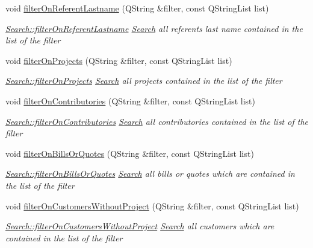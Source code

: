 \begin{DoxyCompactItemize}
void \hyperlink{classModels_1_1Search_a27536d8a999a32164e1ac90bf9d24906}{filter\-On\-Referent\-Lastname} (Q\-String \&filter, const Q\-String\-List list)
\begin{DoxyCompactList}\small\item\em \hyperlink{classModels_1_1Search_a27536d8a999a32164e1ac90bf9d24906}{Search\-::filter\-On\-Referent\-Lastname} \hyperlink{classModels_1_1Search}{Search} all referents last name contained in the {\itshape list} of the {\itshape filter} \end{DoxyCompactList}\item 
void \hyperlink{classModels_1_1Search_a4f5672fa4dc52e3ea7bda9b4c654147f}{filter\-On\-Projects} (Q\-String \&filter, const Q\-String\-List list)
\begin{DoxyCompactList}\small\item\em \hyperlink{classModels_1_1Search_a4f5672fa4dc52e3ea7bda9b4c654147f}{Search\-::filter\-On\-Projects} \hyperlink{classModels_1_1Search}{Search} all projects contained in the {\itshape list} of the {\itshape filter} \end{DoxyCompactList}\item 
void \hyperlink{classModels_1_1Search_acb948c15a52305c29cf4c5b9489e9f18}{filter\-On\-Contributories} (Q\-String \&filter, const Q\-String\-List list)
\begin{DoxyCompactList}\small\item\em \hyperlink{classModels_1_1Search_acb948c15a52305c29cf4c5b9489e9f18}{Search\-::filter\-On\-Contributories} \hyperlink{classModels_1_1Search}{Search} all contributories contained in the {\itshape list} of the {\itshape filter} \end{DoxyCompactList}\item 
void \hyperlink{classModels_1_1Search_ad80f840390720ad3239aa0fc87e483fc}{filter\-On\-Bills\-Or\-Quotes} (Q\-String \&filter, const Q\-String\-List list)
\begin{DoxyCompactList}\small\item\em \hyperlink{classModels_1_1Search_ad80f840390720ad3239aa0fc87e483fc}{Search\-::filter\-On\-Bills\-Or\-Quotes} \hyperlink{classModels_1_1Search}{Search} all bills or quotes which are contained in the {\itshape list} of the {\itshape filter} \end{DoxyCompactList}\item 
void \hyperlink{classModels_1_1Search_af92c03f00f81edeaf5a209d7b830be3a}{filter\-On\-Customers\-Without\-Project} (Q\-String \&filter, const Q\-String\-List list)
\begin{DoxyCompactList}\small\item\em \hyperlink{classModels_1_1Search_af92c03f00f81edeaf5a209d7b830be3a}{Search\-::filter\-On\-Customers\-Without\-Project} \hyperlink{classModels_1_1Search}{Search} all customers which are contained in the {\itshape list} of the {\itshape filter} \end{DoxyCompactList}\item 

\end{DoxyCompactItemize}
